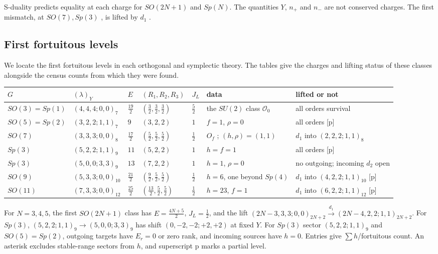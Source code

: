 \documentclass[11pt]{article}
\numberwithin{equation}{section}
\numberwithin{figure}{section}
\numberwithin{table}{section}
\begin{document}
S-duality predicts equality at each charge for $SO(2N+1)$ and $Sp(N)$. The quantities $Y$, $n_+$ and $n_-$ are not conserved charges. The first mismatch, at $SO(7),Sp(3)$ \cite{GLRT,ChangLin}, is lifted by $d_1$ \cite{KonishiBH}.

\subsection{First fortuitous levels}\label{sec-E-SOSp-first}

We locate the first fortuitous levels in each orthogonal and symplectic theory. The tables give the charges and lifting status of these classes alongside the census counts from which they were found.

{\small\renewcommand{\arraystretch}{1.25}\setlength{\tabcolsep}{4pt}
\begin{xltabular}{\linewidth}{@{}lllll>{\raggedright\arraybackslash}X>{\raggedright\arraybackslash}X@{}}
\toprule
$G$ & $(\lambda)_Y$ & $E$ & $(R_1,R_2,R_3)$ & $J_L$ & data & lifted or not\\
\midrule\endhead
$SO(3)=Sp(1)$ & $(4,4,4;0,0)_7$ & $\tfrac{19}2$ & $(\tfrac32,\tfrac32,\tfrac32)$ & $\tfrac52$ & the $SU(2)$ class $\mathcal O_0$ & all orders survival\\
$SO(5)=Sp(2)$ & $(3,2,2;1,1)_7$ & $9$ & $(3,2,2)$ & $1$ & $f=1$, $\rho=0$ & all orders [p]\\
$SO(7)$ & $(3,3,3;0,0)_8$ & $\tfrac{17}2$ & $(\tfrac52,\tfrac52,\tfrac52)$ & $\tfrac12$ & $O_f$ \cite{GLRT}; $(h,\rho)=(1,1)$ & $d_1$ into $(2,2,2;1,1)_8$ \cite{KonishiBH}\\
$Sp(3)$ & $(5,2,2;1,1)_9$ & $11$ & $(5,2,2)$ & $1$ & $h=f=1$ & all orders [p]\\
$Sp(3)$ & $(5,0,0;3,3)_9$ & $13$ & $(7,2,2)$ & $1$ & $h=1$, $\rho=0$ & no outgoing; incoming $d_2$ open\\
$SO(9)$ & $(5,3,3;0,0)_{10}$ & $\tfrac{21}2$ & $(\tfrac92,\tfrac52,\tfrac52)$ & $\tfrac12$ & $h=6$, one beyond $Sp(4)$ & $d_1$ into $(4,2,2;1,1)_{10}$ [p]\\
$SO(11)$ & $(7,3,3;0,0)_{12}$ & $\tfrac{25}2$ & $(\tfrac{13}2,\tfrac52,\tfrac52)$ & $\tfrac12$ & $h=23$, $f=1$ & $d_1$ into $(6,2,2;1,1)_{12}$ [p]\\
\bottomrule
\end{xltabular}}

For $N=3,4,5$, the first $SO(2N+1)$ class has $E=\tfrac{4N+5}2$, $J_L=\tfrac12$, and the lift $(2N-3,3,3;0,0)_{2N+2}\xrightarrow{d_1}(2N-4,2,2;1,1)_{2N+2}$. For $Sp(3)$, $(5,2,2;1,1)_9\to(5,0,0;3,3)_9$ has shift $(0,-2,-2;+2,+2)$ at fixed $Y$. For $Sp(3)$ sector $(5,2,2;1,1)_9$ and $SO(5)=Sp(2)$, outgoing targets have $E_r=0$ or zero rank, and incoming sources have $h=0$. Entries give $\sum h$/fortuitous count. An asterisk excludes stable-range sectors from $h$, and superscript p marks a partial level.
\end{document}
